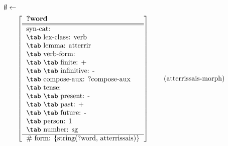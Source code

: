  
\begin{footnotesize}
\begin{align*}\emptyset\leftarrow \\
&\left[
\begin{tabular}{l}
{\bf ?word}\\
\hline \hline syn-cat: \\
\tab lex-class: verb\\
\tab lemma: atterrir\\
\tab verb-form: \\
\tab \tab finite: +\\
\tab \tab infinitive: -\\
\tab compose-aux: ?compose-aux\\
\tab tense: \\
\tab \tab present: -\\
\tab \tab past: +\\
\tab \tab future: -\\
\tab person: 1\\
\tab number: sg\\
\hline \# form: \{string(?word, atterrissais)\}\\
\end{tabular}
\right]\tag{atterrissais-morph}
\end{align*}
\end{footnotesize}